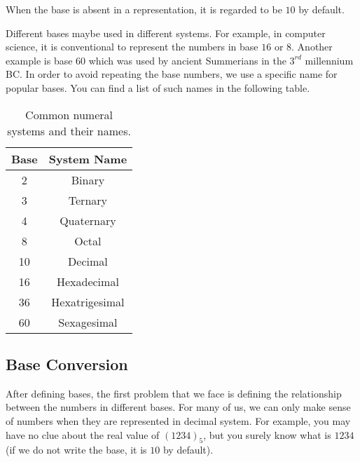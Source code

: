 \documentclass{subfile}
\begin{document}
	\begin{note}
		When the base is absent in a representation, it is regarded to be $10$ by default.
	\end{note}
	Different bases maybe used in different systems. For example, in computer science, it is conventional to represent the numbers in base $16$ or $8$. Another example is base $60$ which was used by ancient Summerians in the $3^{rd}$ millennium BC. In order to avoid repeating the base numbers, we use a specific name for popular bases. You can find a list of such names in the following table.
		\begin{table}
			\centering
		\begin{tabular}{ | c | c | }
			\hline
			\textbf{Base} & \textbf{System Name} \\ \hline
			2 & Binary \\ \hline
			3 & Ternary \\ \hline
			4 & Quaternary \\ \hline
			8 & Octal \\ \hline
			10 & Decimal \\ \hline
			16 & Hexadecimal \\ \hline
			36 & Hexatrigesimal \\ \hline
			60 & Sexagesimal \\ \hline
		\end{tabular}
	\caption{Common numeral systems and their names.} \label{tab:numeral}
	\end{table}
	\subsection{Base Conversion}
	After defining bases, the first problem that we face is defining the relationship between the numbers in different bases. For many of us, we can only make sense of numbers when they are represented in decimal system. For example, you may have no clue about the real value of $(1234)_{5}$, but you surely know what is $1234$ (if we do not write the base, it is $10$ by default).
\end{document}
